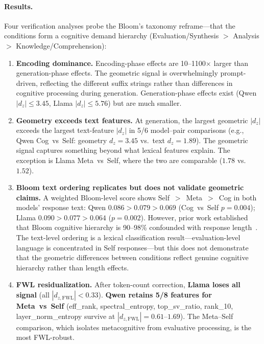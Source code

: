 \documentclass[11pt,a4paper]{article}
\begin{document}
\paragraph{Results.}
Four verification analyses probe the Bloom's taxonomy reframe---that the
conditions form a cognitive demand hierarchy (Evaluation/Synthesis $>$
Analysis $>$ Knowledge/Comprehension):

\begin{enumerate}[nosep]
    \item \textbf{Encoding dominance.} Encoding-phase effects are 10--1100$\times$ larger than generation-phase effects. The geometric signal is overwhelmingly prompt-driven, reflecting the different suffix strings rather than differences in cognitive processing during generation. Generation-phase effects exist (Qwen $|d_z| \leq 3.45$, Llama $|d_z| \leq 5.76$) but are much smaller.

    \item \textbf{Geometry exceeds text features.} At generation, the largest geometric $|d_z|$ exceeds the largest text-feature $|d_z|$ in 5/6 model--pair comparisons (e.g., Qwen Cog~vs~Self: geometry $d_z = 3.45$ vs.\ text $d_z = 1.89$). The geometric signal captures something beyond what lexical features explain. The exception is Llama Meta~vs~Self, where the two are comparable ($1.78$ vs.\ $1.52$).

    \item \textbf{Bloom text ordering replicates but does not validate geometric claims.} A weighted Bloom-level score shows Self~$>$~Meta~$>$~Cog in both models' response text: Qwen $0.086 > 0.079 > 0.069$ (Cog~vs~Self $p = 0.004$); Llama $0.090 > 0.077 > 0.064$ ($p = 0.002$). However, prior work established that Bloom cognitive hierarchy is 90--98\% confounded with response length~\citep{lyra2026campaign3}. The text-level ordering is a lexical classification result---evaluation-level language is concentrated in Self responses---but this does not demonstrate that the geometric differences between conditions reflect genuine cognitive hierarchy rather than length effects.

    \item \textbf{FWL residualization.} After token-count correction, \textbf{Llama loses all signal} (all $|d_{z,\text{FWL}}| < 0.33$). \textbf{Qwen retains 5/8 features for Meta~vs~Self} (eff\_rank, spectral\_entropy, top\_sv\_ratio, rank\_10, layer\_norm\_entropy survive at $|d_{z,\text{FWL}}| = 0.61$--$1.69$). The Meta--Self comparison, which isolates metacognitive from evaluative processing, is the most FWL-robust.
\end{enumerate}
\end{document}
